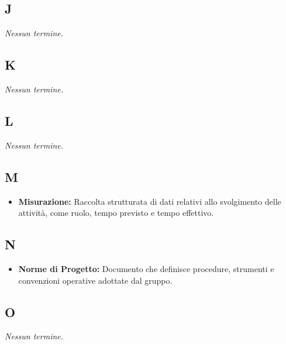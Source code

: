 {}
\subsection*{J}
\textit{Nessun termine.}

{}
\subsection*{K}
\textit{Nessun termine.}

{}
\subsection*{L}
\textit{Nessun termine.}

{}
\subsection*{M}
\begin{itemize}[leftmargin=*]
    \item \textbf{Misurazione:} Raccolta strutturata di dati relativi allo svolgimento delle attività, come ruolo, tempo previsto e tempo effettivo.
\end{itemize}

{}
\subsection*{N}
\begin{itemize}[leftmargin=*]
    \item \textbf{Norme di Progetto:} Documento che definisce procedure, strumenti e convenzioni operative adottate dal gruppo.
\end{itemize}

{}
\subsection*{O}
\textit{Nessun termine.}

{}
